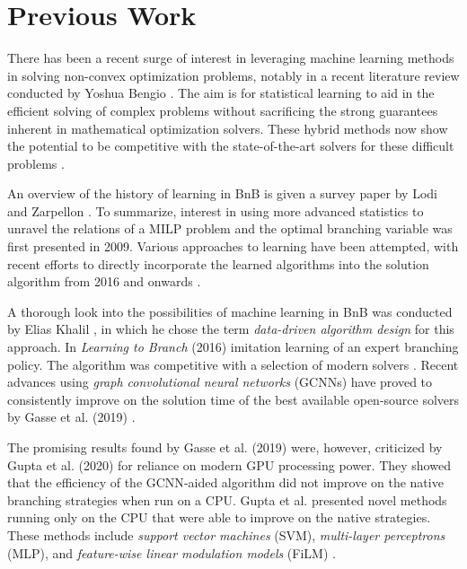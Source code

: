 \section{Previous Work}\label{sec:int_previouswork}

There has been a recent surge of interest in leveraging machine learning methods in solving non-convex optimization problems, notably in a recent literature review conducted by Yoshua Bengio \cite{bengio2020machine}. The aim is for statistical learning to aid in the efficient solving of complex problems without sacrificing the strong guarantees inherent in mathematical optimization solvers. These hybrid methods now show the potential to be competitive with the state-of-the-art solvers for these difficult problems \cite{gasse2019exact}. 

An overview of the history of learning in \gls{BnB} is given a survey paper by Lodi and Zarpellon \cite{lodi2017learning}. To summarize, interest in using more advanced statistics to unravel the relations of a \gls{MILP} problem and the optimal branching variable was first presented in 2009. Various approaches to learning have been attempted, with recent efforts to directly incorporate the learned algorithms into the solution algorithm from 2016 and onwards \cite{lodi2017learning}.  

A thorough look into the possibilities of machine learning in \gls{BnB} was conducted by Elias Khalil \cite{khalil2020towards}, in which he chose the term \textit{data-driven algorithm design} for this approach. 
In \textit{Learning to Branch} (2016) \cite{khalil2016learning} imitation learning of an expert branching policy. The algorithm was competitive with a selection of modern solvers \cite{khalil2016learning}. 
Recent advances using\textit{ graph convolutional neural networks} (\Gls{GCNN}s) have proved to consistently improve on the solution time of the best available open-source solvers by Gasse et al. (2019) \cite{gasse2019exact}. 

The promising results found by Gasse et al. (2019) \cite{gasse2019exact} were, however, criticized by Gupta et al. (2020) \cite{gupta2020hybrid} for reliance on modern \gls{GPU} processing power. They showed that the efficiency of the \gls{GCNN}-aided algorithm did not improve on the native branching strategies when run on a \gls{CPU}. Gupta et al. presented novel methods running only on the \gls{CPU} that were able to improve on the native strategies. These methods include \textit{support vector machines} (\Gls{SVM}), \textit{multi-layer perceptrons} (\Gls{MLP}), and  \textit{feature-wise linear modulation models} (\gls{FiLM}) \cite{gupta2020hybrid}. 

